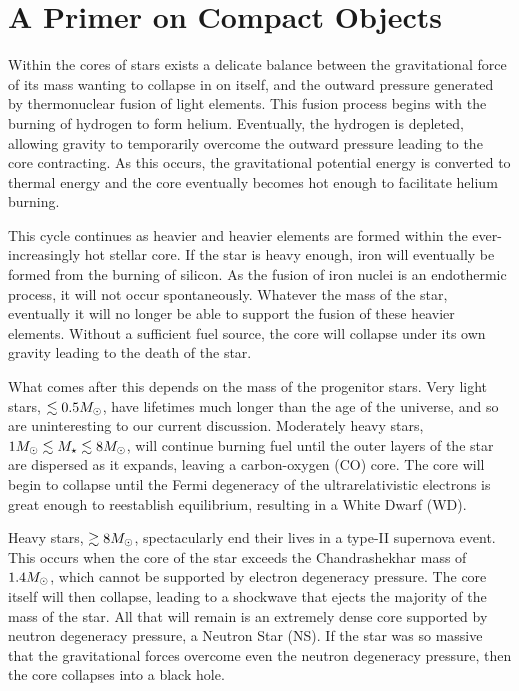 \graphicspath{{img/chapter_2/}}



\chapter{A Primer on Compact Objects}
\label{chapter:compactobjects}


Within the cores of stars exists a delicate balance between the gravitational force of its mass wanting to collapse in on itself, and the outward pressure generated by thermonuclear fusion of light elements. This fusion process begins with the burning of hydrogen to form helium. Eventually, the hydrogen is depleted, allowing gravity to temporarily overcome the outward pressure leading to the core contracting. As this occurs, the gravitational potential energy is converted to thermal energy and the core eventually becomes hot enough to facilitate helium burning. 

This cycle continues as heavier and heavier elements are formed within the ever-increasingly hot stellar core.
If the star is heavy enough, iron will eventually be formed from the burning of silicon. As the fusion of iron nuclei is an endothermic process, it will not occur spontaneously. Whatever the mass of the star, eventually it will no longer be able to support the fusion of these heavier elements. Without a sufficient fuel source, the core will collapse under its own gravity leading to the death of the star.  

What comes after this depends on the mass of the progenitor stars. Very light stars, $\lesssim 0.5 M_\odot$, have lifetimes much longer than the age of the universe, and so are uninteresting to our current discussion. Moderately heavy stars, $1M_\odot\lesssim M_\star \lesssim 8M_\odot$, will continue burning fuel until the outer layers of the star are dispersed as it expands, leaving a carbon-oxygen (CO) core. The core will begin to collapse until the Fermi degeneracy of the ultrarelativistic electrons is great enough to reestablish equilibrium, resulting in a White Dwarf (WD).

Heavy stars, $\gtrsim 8M_\odot$, spectacularly end their lives in a type-II supernova event. This occurs when the core of the star exceeds the Chandrashekhar mass of $1.4M_\odot$, which cannot be supported by electron degeneracy pressure. The core itself will then collapse, leading to a shockwave that ejects the majority of the mass of the star. All that will remain is an extremely dense core supported by neutron degeneracy pressure, a Neutron Star (NS). If the star was so massive that the gravitational forces overcome even the neutron degeneracy pressure, then the core collapses into a black hole. 

